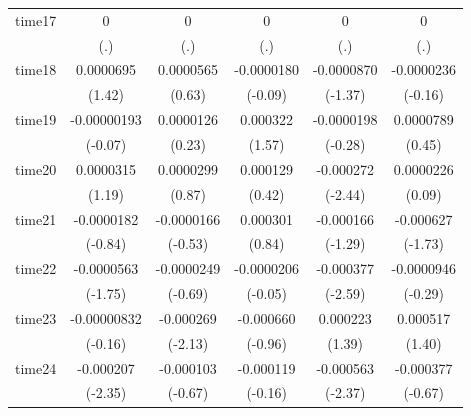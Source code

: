 \begin{table}[htbp]
\begin{tabular}{l*{5}{c}}
time17      &           0         &           0         &           0         &           0         &           0         \\
            &         (.)         &         (.)         &         (.)         &         (.)         &         (.)         \\
time18      &   0.0000695         &   0.0000565         &  -0.0000180         &  -0.0000870         &  -0.0000236         \\
            &      (1.42)         &      (0.63)         &     (-0.09)         &     (-1.37)         &     (-0.16)         \\
time19      & -0.00000193         &   0.0000126         &    0.000322         &  -0.0000198         &   0.0000789         \\
            &     (-0.07)         &      (0.23)         &      (1.57)         &     (-0.28)         &      (0.45)         \\
time20      &   0.0000315         &   0.0000299         &    0.000129         &   -0.000272\sym{*}  &   0.0000226         \\
            &      (1.19)         &      (0.87)         &      (0.42)         &     (-2.44)         &      (0.09)         \\
time21      &  -0.0000182         &  -0.0000166         &    0.000301         &   -0.000166         &   -0.000627         \\
            &     (-0.84)         &     (-0.53)         &      (0.84)         &     (-1.29)         &     (-1.73)         \\
time22      &  -0.0000563         &  -0.0000249         &  -0.0000206         &   -0.000377\sym{**} &  -0.0000946         \\
            &     (-1.75)         &     (-0.69)         &     (-0.05)         &     (-2.59)         &     (-0.29)         \\
time23      & -0.00000832         &   -0.000269\sym{*}  &   -0.000660         &    0.000223         &    0.000517         \\
            &     (-0.16)         &     (-2.13)         &     (-0.96)         &      (1.39)         &      (1.40)         \\
time24      &   -0.000207\sym{*}  &   -0.000103         &   -0.000119         &   -0.000563\sym{*}  &   -0.000377         \\
            &     (-2.35)         &     (-0.67)         &     (-0.16)         &     (-2.37)         &     (-0.67)         \\

\end{tabular}
\end{table}
